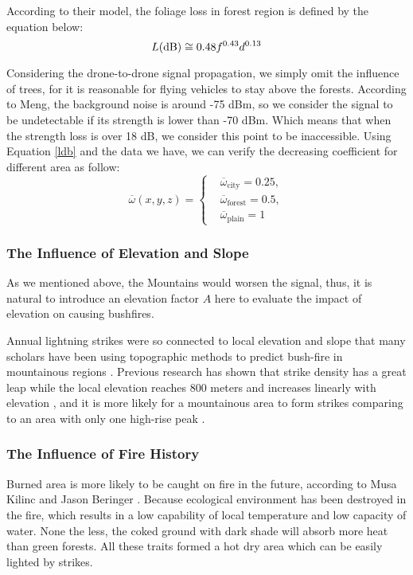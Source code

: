 \documentclass[13pt]{ctexart} %
\begin{document}
According to their model, the foliage loss in forest region is defined by the equation below:
\begin{equation}\label{ldb}
    L({\rm dB})\cong 0.48 f^{0.43} d^{0.13}
\end{equation}

Considering the drone-to-drone signal propagation, we simply omit the influence of trees, for it is reasonable for flying vehicles to stay above the forests. According to Meng, the background noise is around -75 dBm, so we consider the signal to be undetectable if its strength is lower than -70 dBm. Which means that when the strength loss is over 18 dB, we consider this point to be inaccessible. Using Equation \eqref{ldb} and the data we have, we can verify the decreasing coefficient for different area as follow:
\begin{equation}\label{omega-function}
    \overline{\omega}
    (x,y,z)=
    \left\{
    \begin{aligned}
         & \overline{\omega}_{\text{city}}=0.25,  \\
         & \overline{\omega}_{\text{forest}}=0.5, \\
         & \overline{\omega}_{\text{plain}}=1
    \end{aligned}
    \right.
\end{equation}

\subsubsection{The Influence of Elevation and Slope}
As we mentioned above, the Mountains would worsen the signal, thus, it is natural to introduce an elevation factor $A$ here to evaluate the impact of elevation on causing bushfires.

Annual lightning strikes were so connected to local elevation and slope that many scholars have been using topographic methods to predict bush-fire in mountainous regions \cite{Jiao-wildfire-cn}. Previous research has shown that strike density has a great leap while the local elevation reaches 800 meters and increases linearly with elevation \cite{Musa-lightning02}, and it is more likely for a mountainous area to form strikes comparing to an area with only one high-rise peak \cite{Jiao-wildfire-cn}.


\subsubsection{The Influence of Fire History}
Burned area is more likely to be caught on fire in the future, according to Musa Kilinc and Jason Beringer \cite{Musa-lightning02}. Because ecological environment has been destroyed in the fire, which results in a low capability of local temperature and low capacity of water. None the less, the coked ground with dark shade will absorb more heat than green forests. All these traits formed a hot dry area which can be easily lighted by strikes.
\end{document}
